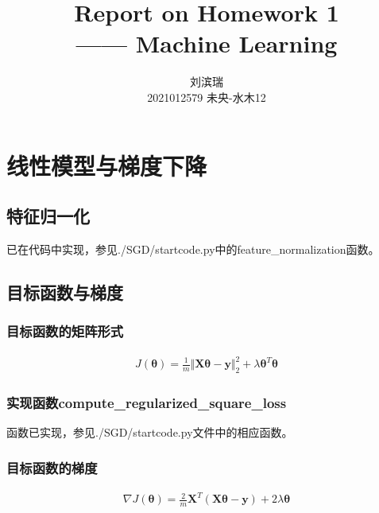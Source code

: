 \documentclass[12pt, a4paper]{article}
\title{{\Huge{\textbf{Report on Homework 1 \\}}} —— Machine Learning}
\author{刘滨瑞 \\ 2021012579 \quad 未央-水木12}
\newcommand{\imat}{\bm}
\newcommand{\ivec}{\bm}
\newcommand{\Xm}{\imat{X}}
\newcommand{\thetav}{\ivec{\theta}}
\newcommand{\yv}{\ivec{y}}
\begin{document}
\maketitle


\section{线性模型与梯度下降}

    \subsection{特征归一化}

    已在代码中实现，参见./SGD/startcode.py中的feature\_normalization函数。

    \subsection{目标函数与梯度}

    \subsubsection{目标函数的矩阵形式}

        \begin{equation}\begin{aligned}
        J(\thetav) = \frac{1}{m} \Vert \Xm \thetav - \yv \Vert_2^2 + \lambda \thetav^T \thetav
        \end{aligned}\end{equation}

    \subsubsection{实现函数compute\_regularized\_square\_loss}

        函数已实现，参见./SGD/startcode.py文件中的相应函数。

    \subsubsection{目标函数的梯度}

        \begin{equation}\begin{aligned}
        \nabla J(\thetav) = \frac{2}{m} \Xm^T (\Xm \thetav - \yv) + 2 \lambda \thetav
        \end{aligned}\end{equation}
\end{document}
